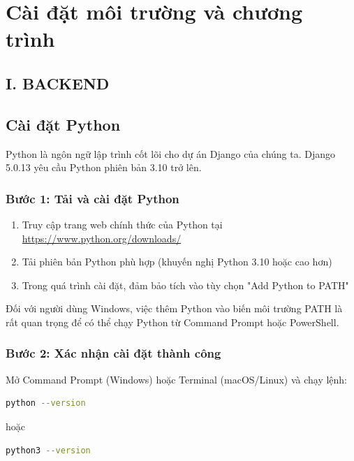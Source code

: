 \chapter{Cài đặt môi trường và chương trình}
\section*{I. BACKEND}

\section{Cài đặt Python}

Python là ngôn ngữ lập trình cốt lõi cho dự án Django của chúng ta. Django 5.0.13 yêu cầu Python phiên bản 3.10 trở lên.

\subsection{Bước 1: Tải và cài đặt Python}

\begin{enumerate}
    \item Truy cập trang web chính thức của Python tại \url{https://www.python.org/downloads/}
    \item Tải phiên bản Python phù hợp (khuyến nghị Python 3.10 hoặc cao hơn)
    \item Trong quá trình cài đặt, đảm bảo tích vào tùy chọn "Add Python to PATH"
\end{enumerate}

\begin{tcolorbox}[colback=yellow!10, colframe=yellow!50!black, title=Lưu ý quan trọng]
Đối với người dùng Windows, việc thêm Python vào biến môi trường PATH là rất quan trọng để có thể chạy Python từ Command Prompt hoặc PowerShell.
\end{tcolorbox}

\subsection{Bước 2: Xác nhận cài đặt thành công}

Mở Command Prompt (Windows) hoặc Terminal (macOS/Linux) và chạy lệnh:

\begin{lstlisting}[language=bash]
python --version
\end{lstlisting}

hoặc

\begin{lstlisting}[language=bash]
python3 --version
\end{lstlisting}

